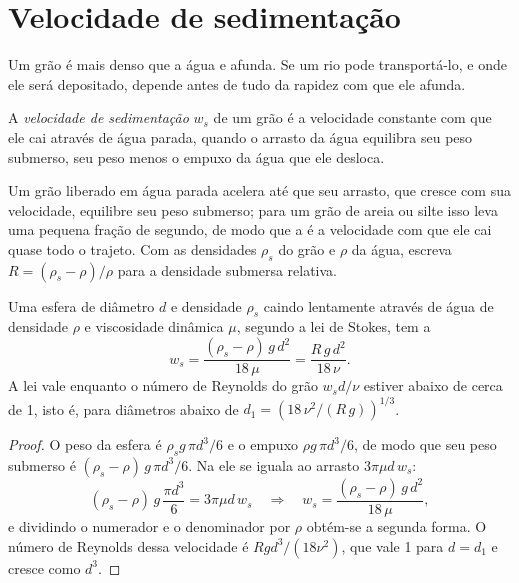 \section{Velocidade de sedimentação}\label{sec:b1:erosion-transport:settling}

Um grão é mais denso que a água e afunda. Se um rio pode transportá-lo, e onde ele será depositado, depende antes de tudo da rapidez com que ele afunda.

\begin{definition}\label{def:b1:erosion-transport:settling}
A \emph{velocidade de sedimentação} $w_s$ de um grão é a velocidade constante com que ele cai através de água parada, quando o arrasto da água equilibra seu peso submerso, seu peso menos o empuxo da água que ele desloca.
\end{definition}

Um grão liberado em água parada acelera até que seu arrasto, que cresce com sua velocidade, equilibre seu peso submerso; para um grão de areia ou silte isso leva uma pequena fração de segundo, de modo que a  é a velocidade com que ele cai quase todo o trajeto. Com as densidades $\rho_s$ do grão e $\rho$ da água, escreva $R = (\rho_s - \rho)/\rho$ para a densidade submersa relativa.

\begin{proposition}\label{prop:b1:erosion-transport:stokes}
Uma esfera de diâmetro $d$ e densidade $\rho_s$ caindo lentamente através de água de densidade $\rho$ e viscosidade dinâmica $\mu$, segundo a lei de Stokes, tem a 
\[
  w_s = \frac{(\rho_s - \rho)\,g\,d^2}{18\,\mu} = \frac{R\,g\,d^2}{18\,\nu}.
\]
A lei vale enquanto o número de Reynolds do grão $w_s d/\nu$ estiver abaixo de cerca de 1, isto é, para diâmetros abaixo de $d_1 = \left(18\,\nu^2/(R\,g)\right)^{1/3}$.
\end{proposition}

\begin{proof}
O peso da esfera é $\rho_s g\,\pi d^3/6$ e o empuxo
$\rho g\,\pi d^3/6$, de modo que seu peso submerso é $(\rho_s - \rho)\,g\,\pi d^3/6$. Na  ele se iguala ao arrasto $3\pi\mu d\,w_s$:
\[
  (\rho_s - \rho)\,g\,\frac{\pi d^3}{6} = 3\pi\mu d\,w_s
  \quad\Longrightarrow\quad
  w_s = \frac{(\rho_s - \rho)\,g\,d^2}{18\,\mu},
\]
e dividindo o numerador e o denominador por $\rho$ obtém-se a segunda forma. O número de Reynolds dessa velocidade é $R g d^3/(18\nu^2)$, que vale 1 para
$d = d_1$ e cresce como $d^3$.
\end{proof}

